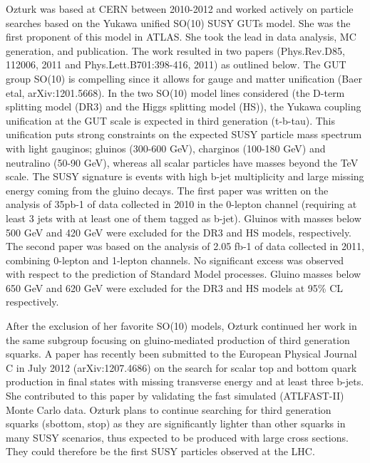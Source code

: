 
 Ozturk was based at CERN
between 2010-2012 and worked actively on particle searches based on
the Yukawa unified SO(10) SUSY GUTs model. She was the first proponent
of this model in ATLAS. She took the lead in data analysis, MC
generation, and publication. The work resulted in two papers
(Phys.Rev.D85, 112006, 2011 and Phys.Lett.B701:398-416, 2011) as
outlined below.  The GUT group SO(10) is compelling since it allows
for gauge and matter unification (Baer etal, arXiv:1201.5668). In the
two SO(10) model lines considered (the D-term splitting model (DR3)
and the Higgs splitting model (HS)), the Yukawa coupling unification
at the GUT scale is expected in third generation (t-b-tau). This
unification puts strong constraints on the expected SUSY particle mass
spectrum with light gauginos; gluinos (300-600 GeV), charginos
(100-180 GeV) and neutralino (50-90 GeV), whereas all scalar particles
have masses beyond the TeV scale. The SUSY signature is events with
high b-jet multiplicity and large missing energy coming from the
gluino decays.  The first paper was written on the analysis of 35pb-1
of data collected in 2010 in the 0-lepton channel (requiring at least
3 jets with at least one of them tagged as b-jet). Gluinos with masses
below 500 GeV and 420 GeV were excluded for the DR3 and HS models,
respectively. The second paper was based on the analysis of 2.05 fb-1
of data collected in 2011, combining 0-lepton and 1-lepton
channels. No significant excess was observed with respect to the
prediction of Standard Model processes. Gluino masses below 650 GeV
and 620 GeV were excluded for the DR3 and HS models at 95\% CL
respectively.

After the exclusion of her favorite SO(10) models, Ozturk continued
her work in the same subgroup focusing on gluino-mediated production
of third generation squarks. A paper has recently been submitted to
the European Physical Journal C in July 2012 (arXiv:1207.4686) on the
search for scalar top and bottom quark production in final states with
missing transverse energy and at least three b-jets. She contributed
to this paper by validating the fast simulated (ATLFAST-II) Monte
Carlo data. Ozturk plans to continue searching for third generation
squarks (sbottom, stop) as they are significantly lighter than other
squarks in many SUSY scenarios, thus expected to be produced with
large cross sections. They could therefore be the first SUSY particles
observed at the LHC.

